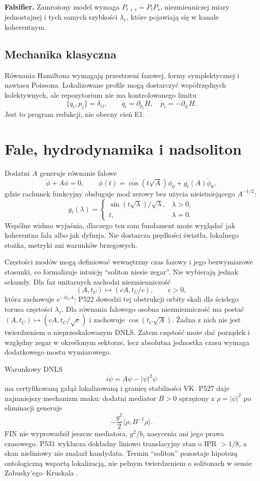 \documentclass[11pt,a4paper]{article}
\begin{document}
\textbf{Falsifier.} Zamrożony model wymaga $P_{t+s}=P_tP_s$, niezmienniczej miary jednostajnej i tych samych szybkości $\lambda_r$, które pojawiają się w kanale koherentnym.

\subsection{Mechanika klasyczna}

Równania Hamiltona wymagają przestrzeni fazowej, formy symplektycznej i nawiasu Poissona. Lokalizowane profile mogą dostarczyć współrzędnych kolektywnych, ale repozytorium nie ma kontrolowanego limitu
\[
\{q_i,p_j\}=\delta_{ij},\qquad
\dot q_i=\partial_{p_i}H,\quad \dot p_i=-\partial_{q_i}H.
\]
Jest to program redukcji, nie obecny cień E1.

\section{Fale, hydrodynamika i nadsoliton}

Dodatni $A$ generuje równanie falowe
\[
\ddot\phi+A\phi=0,\qquad
\phi(t)=\cos(t\sqrt A)\phi_0+g_t(A)\dot\phi_0,
\]
gdzie rachunek funkcyjny obsługuje mod zerowy bez użycia nieistniejącego $A^{-1/2}$:
\[
g_t(\lambda)=
\begin{cases}
\sin(t\sqrt\lambda)/\sqrt\lambda,&\lambda>0,\\
t,&\lambda=0.
\end{cases}
\]
Wspólne widmo wyjaśnia, dlaczego ten sam fundament może wyglądać jak koherentna fala albo jak dyfuzja. Nie dostarcza prędkości światła, lokalnego stożka, metryki ani warunków brzegowych.

Częstości modów mogą definiować wewnętrzny czas fazowy i jego bezwymiarowe stosunki, co formalizuje intuicję ``soliton niesie zegar''. Nie wybierają jednak sekundy. Dla faz unitarnych zachodzi niezmienniczość
\[
(A,t_U)\longmapsto(cA,t_U/c),\qquad c>0,
\]
która zachowuje $e^{-it_UA}$; P522 dowodzi tej obstrukcji orbity skali dla ścisłego torusa częstości $\lambda_r$. Dla równania falowego osobna niezmienniczość ma postać $(A,t_C)\mapsto(cA,t_C/\sqrt c)$ i zachowuje $\cos(t_C\sqrt A)$. Żadna z nich nie jest twierdzeniem o nieprzeskalowanym DNLS. Zatem częstość może dać porządek i względny zegar w określonym sektorze, lecz absolutna jednostka czasu wymaga dodatkowego mostu wymiarowego.

Warunkowy DNLS
\[
i\dot\psi=A\psi-|\psi|^2\psi
\]
ma certyfikowaną gałąź lokalizowaną i granicę stabilności VK. P527 daje najmniejszy mechanizm znaku: dodatni mediator $B>0$ sprzężony z $\rho=|\psi|^2$ po eliminacji generuje
\[
-\frac{g^2}{2}\langle\rho,B^{-1}\rho\rangle.
\]
FIN nie wyprowadził jeszcze mediatora, $g^2/b$, nasycenia ani jego prawa czasowego. P531 wyklucza dokładny liniowo translacyjny stan o IPR $>1/8$, a skan nieliniowy nie znalazł kandydata. Termin ``soliton'' pozostaje hipotezą ontologiczną wspartą lokalizacją, nie pełnym twierdzeniem o solitonach w sensie Zabusky'ego--Kruskala \cite{ZabuskyKruskal}.
\end{document}
